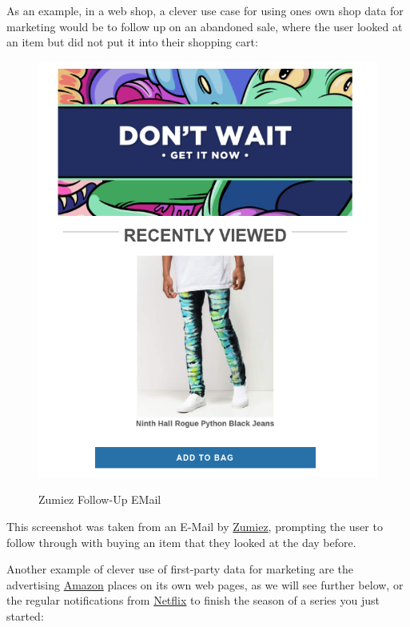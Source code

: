 As an example, in a web shop, a clever use case for using ones own shop data for marketing would be to follow up on an abandoned sale, where the user looked at an item but did not put it into their shopping cart:

\begin{figure}[H]
\centering
\caption {Zumiez Follow-Up EMail}
\includegraphics[scale=0.6]{images/zumiez-dont-wait.png}
\label{fig:zumiez}
\end{figure}

This screenshot was taken from an E-Mail by \href{https://www.zumiez.com/}{Zumiez}, prompting the user to follow through with buying an item that they looked at the day before.

Another example of clever use of first-party data for marketing are the advertising \href{https://smile.amazon.de/}{Amazon} places on its own web pages, as we will see further below, or the regular notifications from \href{https://www.netflix.com/de-en/}{Netflix} to finish the season of a series you just started:

